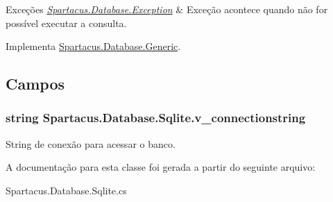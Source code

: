 \begin{DoxyExceptions}{Exceções}
{\em \hyperlink{classSpartacus_1_1Database_1_1Exception}{Spartacus.\+Database.\+Exception}} & Exceção acontece quando não for possível executar a consulta.\\
\hline
\end{DoxyExceptions}


Implementa \hyperlink{classSpartacus_1_1Database_1_1Generic_a434ce0b27dfa73d909bc79c0b8471e54}{Spartacus.\+Database.\+Generic}.



\subsection{Campos}
\hypertarget{classSpartacus_1_1Database_1_1Sqlite_aef2f3f04e82b23a55a684c532f6aee99}{
\subsubsection[{v\+\_\+connectionstring}]{\setlength{\rightskip}{0pt plus 5cm}string Spartacus.\+Database.\+Sqlite.\+v\+\_\+connectionstring}}\label{classSpartacus_1_1Database_1_1Sqlite_aef2f3f04e82b23a55a684c532f6aee99}


String de conexão para acessar o banco. 



A documentação para esta classe foi gerada a partir do seguinte arquivo\+:\begin{DoxyCompactItemize}
\item 
Spartacus.\+Database.\+Sqlite.\+cs\end{DoxyCompactItemize}
